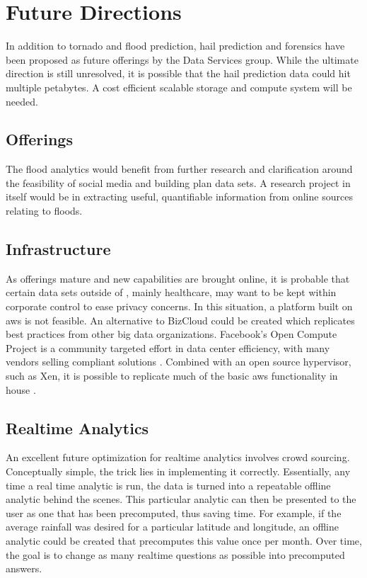 \section{Future Directions}
In addition to tornado and flood prediction, hail prediction and forensics have been proposed as future \climatedge offerings by the Data Services group. While the ultimate direction is still unresolved, it is possible that the hail prediction data could hit multiple petabytes. A cost efficient scalable storage and compute system will be needed.
\subsection{Offerings}
The flood analytics would benefit from further research and clarification around the feasibility of social media and building plan data sets. A research project in itself would be in extracting useful, quantifiable information from online sources relating to floods.
\subsection{Infrastructure}
As offerings mature and new capabilities are brought online, it is probable that certain data sets outside of \climatedge, mainly healthcare, may want to be kept within corporate control to ease privacy concerns. In this situation, a platform built on \gls{aws} is not feasible. An alternative to BizCloud could be created which replicates best practices from other big data organizations. Facebook's Open Compute Project is a community targeted effort in data center efficiency, with many vendors selling compliant solutions \cite{opencompute}. Combined with an open source hypervisor, such as Xen, it is possible to replicate much of the basic \gls{aws} functionality in house \cite{xen}.
\subsection{Realtime Analytics}
An excellent future optimization for realtime analytics involves crowd sourcing. Conceptually simple, the trick lies in implementing it correctly. Essentially, any time a real time analytic is run, the data is turned into a repeatable offline analytic behind the scenes. This particular analytic can then be presented to the user as one that has been precomputed, thus saving time. For example, if the average rainfall was desired for a particular latitude and longitude, an offline analytic could be created that precomputes this value once per month. Over time, the goal is to change as many realtime questions as possible into precomputed answers.